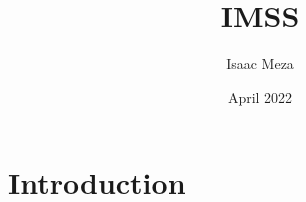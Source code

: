 \documentclass{article}
\title{IMSS}
\author{Isaac Meza}
\date{April 2022}
\begin{document}
\maketitle

\section{Introduction}
\end{document}
